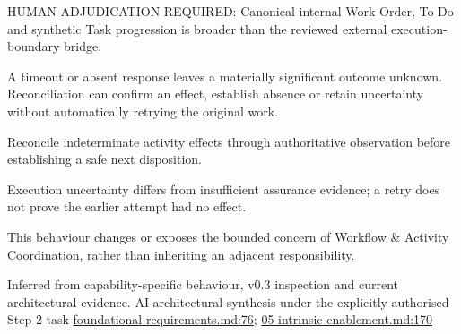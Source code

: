 HUMAN ADJUDICATION REQUIRED: Canonical internal Work Order, To Do and synthetic Task progression is broader than the reviewed external execution-boundary bridge.



A timeout or absent response leaves a materially significant outcome unknown. Reconciliation can confirm an effect, establish absence or retain uncertainty without automatically retrying the original work.



Reconcile indeterminate activity effects through authoritative observation before establishing a safe next disposition.



Execution uncertainty differs from insufficient assurance evidence; a retry does not prove the earlier attempt had no effect.



This behaviour changes or exposes the bounded concern of Workflow \& Activity Coordination, rather than inheriting an adjacent responsibility.


Inferred from capability-specific behaviour, v0.3 inspection and current architectural evidence. AI architectural synthesis under the explicitly authorised Step 2 task \hyperref[evidence:f24cea53325717eb]{foundational-requirements.md:76}; \hyperref[evidence:d70bf9b0b197558f]{05-intrinsic-enablement.md:170}
